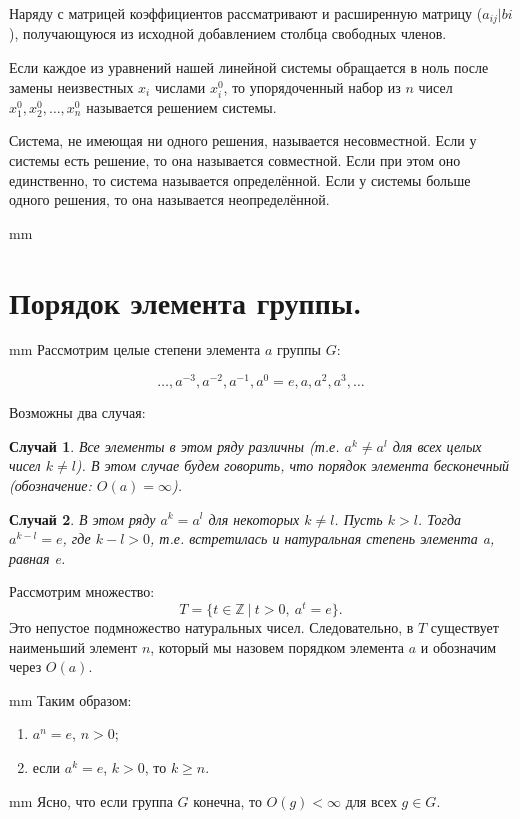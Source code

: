 \documentclass[12pt,english,russian]{article}
\newtheorem{sluch}{Случай}
\begin{document}
	Наряду с матрицей коэффициентов рассматривают и
	расширенную матрицу
	($a_{ij}|bi$), получающуюся из исходной добавлением столбца свободных членов.

	Если каждое из уравнений нашей линейной системы обращается в ноль после замены неизвестных 
	$x_i$ числами
	$x_i^0$, то упорядоченный набор из $n$ чисел
	$x_1^0, x_2^0, \dots , x_n^0$ называется решением
	системы. 

	Система, не имеющая ни одного решения, называется
	несовместной. Если у системы есть решение, то она называется
	совместной. Если при этом оно единственно, то система называется
	определённой. Если у системы больше одного решения, то она называется
	неопределённой.
	
	 mm
		\section{\bf Порядок элемента группы.}
	
	 mm
	Рассмотрим целые степени элемента $a$ группы $G$:
	
	$$\dots ,a^{-3},a^{-2},a^{-1},a^0 = e,a,a^2,a^3,\dots$$
	
	Возможны два случая:
	\begin{sluch}
		Все элементы в этом ряду различны (т.е. $a^k \ne a^l$ для 
		всех целых чисел $k\ne l$). В этом случае будем говорить, 
		что порядок элемента бесконечный (обозначение: $O(a) = \infty$).
	\end{sluch}
	
	\begin{sluch}
		В этом ряду $a^k = a^l$ для некоторых $k \ne l$. Пусть $k > l$. 
		Тогда $a^{k-l}=e$, где $k-l > 0$, т.е. встретилась и натуральная 
		степень элемента a, равная e. 
	\end{sluch}
	Рассмотрим множество:
	\begin{equation}
		T = \{t \in \mathbb{Z} \ | \ t>0, \ a^t = e\}.
	\end{equation}
	Это непустое подмножество натуральных чисел. Следовательно, в
	$T$ существует наименьший элемент $n$, который мы назовем порядком элемента $a$
	и обозначим через $O(a)$.
	
		 mm
	Таким образом:
	\begin{enumerate}
		\item $a^n=e$, $n>0$;
		\item если $a^k=e$, $k>0$, то $k\geqslant n$.
	\end{enumerate}
	
	 mm
	Ясно, что если группа $G$ конечна, то $O(g) < \infty$ для 
	всех $g\in G$.
	
\end{document}

